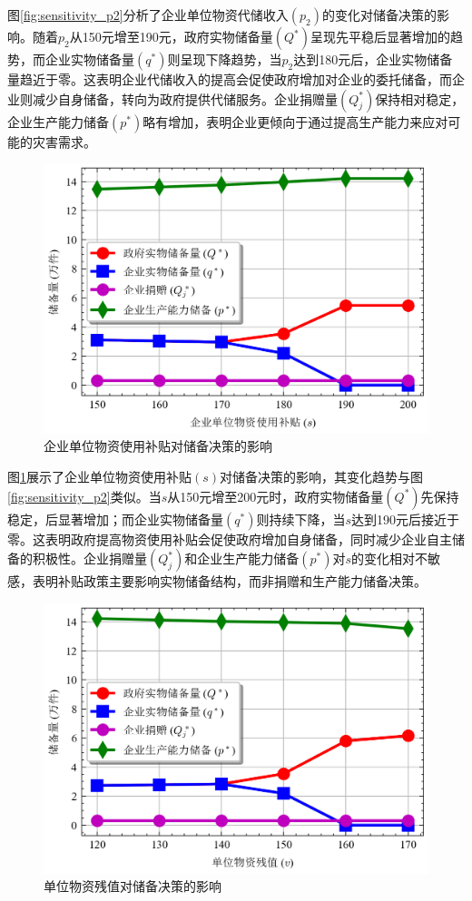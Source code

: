 \documentclass[a4paper,8pt,twocolumn]{article} %
\begin{document}
图\ref{fig:sensitivity_p2}分析了企业单位物资代储收入$(p_2)$的变化对储备决策的影响。随着$p_2$从150元增至190元，政府实物储备量$(Q^*)$呈现先平稳后显著增加的趋势，而企业实物储备量$(q^*)$则呈现下降趋势，当$p_2$达到180元后，企业实物储备量趋近于零。这表明企业代储收入的提高会促使政府增加对企业的委托储备，而企业则减少自身储备，转向为政府提供代储服务。企业捐赠量$(Q_j^*)$保持相对稳定，企业生产能力储备$(p^*)$略有增加，表明企业更倾向于通过提高生产能力来应对可能的灾害需求。
\begin{figure}[H]
\centering
\includegraphics[width=\linewidth]{basic_pictures/sensitivity_s.png}
\caption{企业单位物资使用补贴对储备决策的影响}
\label{fig:sensitivity_s}
\end{figure}
图\ref{fig:sensitivity_s}展示了企业单位物资使用补贴$(s)$对储备决策的影响，其变化趋势与图\ref{fig:sensitivity_p2}类似。当$s$从150元增至200元时，政府实物储备量$(Q^*)$先保持稳定，后显著增加；而企业实物储备量$(q^*)$则持续下降，当$s$达到190元后接近于零。这表明政府提高物资使用补贴会促使政府增加自身储备，同时减少企业自主储备的积极性。企业捐赠量$(Q_j^*)$和企业生产能力储备$(p^*)$对$s$的变化相对不敏感，表明补贴政策主要影响实物储备结构，而非捐赠和生产能力储备决策。
\begin{figure}[H]
\centering
\includegraphics[width=\linewidth]{basic_pictures/sensitivity_v.png}
\caption{单位物资残值对储备决策的影响}
\label{fig:sensitivity_v}
\end{figure}
\end{document}
